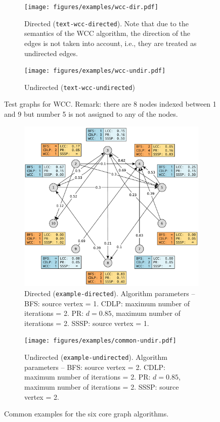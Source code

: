 \begin{figure}[h]
	\centering
	\begin{subfigure}[t]{0.496\textwidth}
		\centering
		\texttt{[image: figures/examples/wcc-dir.pdf]}
		\caption{Directed (\texttt{text-wcc-directed}). Note that due to the semantics of the WCC algorithm, the direction of the edges is not taken into account, i.e., they are treated as undirected edges.}
	\end{subfigure}
	\begin{subfigure}[t]{0.496\textwidth}
		\centering
		\texttt{[image: figures/examples/wcc-undir.pdf]}
		\caption{Undirected (\texttt{text-wcc-undirected})}
	\end{subfigure}
	\caption{Test graphs for WCC. Remark: there are 8 nodes indexed between 1 and 9 but number 5 is not assigned to any of the nodes.}
	\label{fig:wcc_example}
\end{figure}

\begin{figure}[h]
	\centering
	\begin{subfigure}{\textwidth}
		\centering
		\includegraphics[scale=\examplescale]{figures/examples/common-dir.pdf}
		\caption{Directed (\texttt{example-directed}).
			Algorithm parameters --
			BFS: source vertex = 1.
			CDLP: maximum number of iterations = 2.
			PR: $d = 0.85$, maximum number of iterations = 2.
			SSSP: source vertex = 1.}
	\end{subfigure}
	\begin{subfigure}{\textwidth}
		\centering
		\texttt{[image: figures/examples/common-undir.pdf]}
		\caption{Undirected (\texttt{example-undirected}).
			Algorithm parameters --
			BFS: source vertex = 2.
			CDLP: maximum number of iterations = 2.
			PR: $d = 0.85$, maximum number of iterations = 2.
			SSSP: source vertex = 2.}
	\end{subfigure}
	\caption{Common examples for the six core graph algorithms.}
	\label{fig:common_example}
\end{figure}
